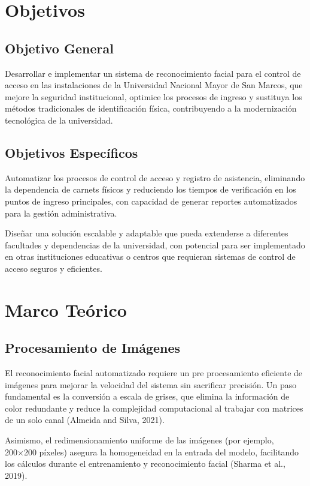 \documentclass[12pt]{article}
\begin{document}
{%
\section{Objetivos}
\subsection{Objetivo General}
Desarrollar e implementar un sistema de reconocimiento facial para el control de acceso en las instalaciones de la Universidad Nacional Mayor de San Marcos, que mejore la seguridad institucional, optimice los procesos de ingreso y sustituya los métodos tradicionales de identificación física, contribuyendo a la modernización tecnológica de la universidad.

\subsection{Objetivos Específicos}
Automatizar los procesos de control de acceso y registro de asistencia, eliminando la dependencia de carnets físicos y reduciendo los tiempos de verificación en los puntos de ingreso principales, con capacidad de generar reportes automatizados para la gestión administrativa.

Diseñar una solución escalable y adaptable que pueda extenderse a diferentes facultades y dependencias de la universidad, con potencial para ser implementado en otras instituciones educativas o centros que requieran sistemas de control de acceso seguros y eficientes.

\section{Marco Teórico}
\subsection{Procesamiento de Imágenes}
El reconocimiento facial automatizado requiere un pre procesamiento eficiente de imágenes para mejorar la velocidad del sistema sin sacrificar precisión. Un paso fundamental es la conversión a escala de grises, que elimina la información de color redundante y reduce la complejidad computacional al trabajar con matrices de un solo canal (Almeida and Silva, 2021).

Asimismo, el redimensionamiento uniforme de las imágenes (por ejemplo, 200×200 píxeles) asegura la homogeneidad en la entrada del modelo, facilitando los cálculos durante el entrenamiento y reconocimiento facial (Sharma et al., 2019).

}
\end{document}

